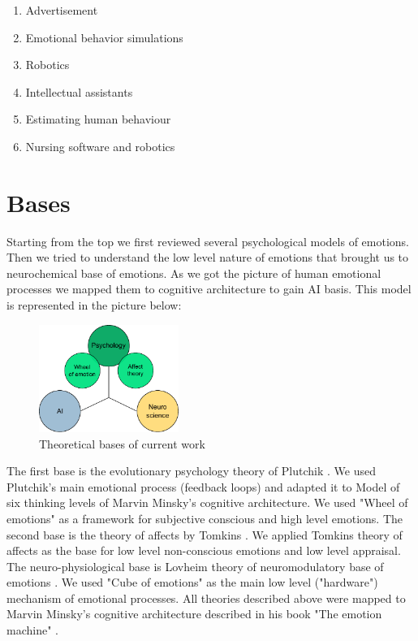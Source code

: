 \begin{enumerate}
 \item  Advertisement
 \item  Emotional behavior simulations
 \item  Robotics
 \item  Intellectual assistants
 \item  Estimating human behaviour
 \item  Nursing software and robotics
\end{enumerate}

\section{Bases}

Starting from the top we first reviewed several psychological models of emotions. Then we tried to understand the low level nature of emotions that brought us to neurochemical base of emotions. As we got the picture of human emotional processes we mapped them to cognitive architecture to gain AI basis. This model is represented in the picture below:

\begin{figure}
\begin{center}
 \includegraphics[height=3.5cm]{figure1_3_bases}
\end{center}
\caption{Theoretical bases of current work}
\end{figure}

The first base is the evolutionary psychology theory of Plutchik \cite{natureofemotions}. We used Plutchik's main emotional process (feedback loops) and adapted it to Model of six \cite{emotionmachine} thinking levels of Marvin Minsky's cognitive architecture. We used "Wheel of emotions" \cite{natureofemotions} as a framework for subjective conscious and high level emotions.
The second base is the theory of affects by Tomkins \cite{primer_affect_psychology, tomkins1, tomkins2, tomkins3}. We applied Tomkins theory of affects as the base for low level non-conscious emotions and low level appraisal.
The neuro-physiological base is Lovheim theory of neuromodulatory base of emotions \cite{cubeofemotions}. We used "Cube of emotions" as the main low level ("hardware") mechanism of emotional processes.
All theories described above were mapped to Marvin Minsky's cognitive architecture described in his book "The emotion machine" \cite{emotionmachine}.

